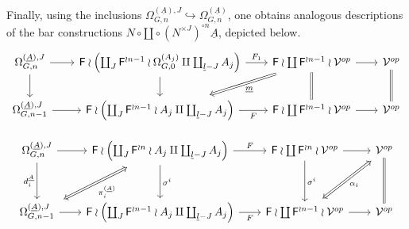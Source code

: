 \documentclass[a4paper,10pt]{article}%
\begin{document}
Finally, using the inclusions $\Omega_{G,n}^{(\underline{A}),J} \hookrightarrow \Omega_{G,n}^{(\underline{A})}$,
one obtains analogous descriptions of the bar constructions 
$N \circ \amalg \circ (N^{\times J})^{\circ n} \underline{A}$, 
depicted below.
\begin{equation}
  \begin{tikzcd}[column sep=2em]
    \Omega_{G,n}^{(\underline{A}),J} \ar{d} \ar{r} &
    \Fin \wr \left( \coprod_J \Fin^{\wr n-1} \wr \Omega_{G,0}^{(A_j)} 
      \amalg \coprod_{\underline{l}-J} A_j \right)
    \ar{r}{F_1} \ar{d}&
    |[alias=dog2]|
    \Fin \wr \coprod \Fin^{\wr n-1} \wr \mathcal{V}^{op} \ar{r}  \ar[equal]{d} &
    \mathcal{V}^{op} \ar[equal]{d}
    \\
    \Omega_{G,n-1}^{(\underline{A}),J} \ar{r} &
    |[alias=cat3]|
    \Fin \wr \left( \coprod_J \Fin^{\wr n-1} \wr A_j
      \amalg \coprod_{\underline{l}-J} A_j \right)
    \ar{r}[swap]{F} &
    \Fin \wr \coprod \Fin^{\wr n-1} \wr \mathcal{V}^{op} \ar{r} &
    \mathcal{V}^{op}
    \arrow[Rightarrow, from=dog2, to=cat3,shorten <=0.15cm,,shorten >=0.15cm,"\underline{m}"]
  \end{tikzcd}
\end{equation}

\begin{equation}\label{DISJBARDNJ EQ}
  \begin{tikzcd}[column sep=2em,row sep=3em]
    \Omega_{G,n}^{(\underline{A}),J} 
    \ar{d}[swap]{d_i^{\underline{A}}} \ar{r} &
    |[alias=dog2]|
    \Fin \wr \left( \coprod_J \Fin^{\wr n} \wr A_j 
      \amalg \coprod_{\underline{l}-J} A_j \right)
    \ar{r}{F} \ar{d}{\sigma^i}&
    \Fin \wr \coprod \Fin^{\wr n} \wr \mathcal{V}^{op} \ar{r}  \ar{d}{\sigma^i} &
    |[alias=dog3]|
    \mathcal{V}^{op} \ar[equal]{d}
    \\
    |[alias=cat3]|
    \Omega_{G,n-1}^{(\underline{A}),J} \ar{r} &
    \Fin \wr \left( \coprod_J \Fin^{\wr n-1} \wr A_j
      \amalg \coprod_{\underline{l}-J} A_j \right) \ar{r}[swap]{F} &
    |[alias=cat2]|
    \Fin \wr \coprod \Fin^{\wr n-1} \wr \mathcal{V}^{op} \ar{r} &
    \mathcal{V}^{op}
    \arrow[Leftrightarrow, from=dog2, to=cat3,shorten <=0.15cm,,shorten >=0.15cm,"\pi_i^{(\underline{A})}"]
    \arrow[Leftrightarrow, from=dog3, to=cat2,shorten <=0.15cm,,shorten >=0.15cm,"\alpha_i"]
  \end{tikzcd}
\end{equation}
\end{document}
